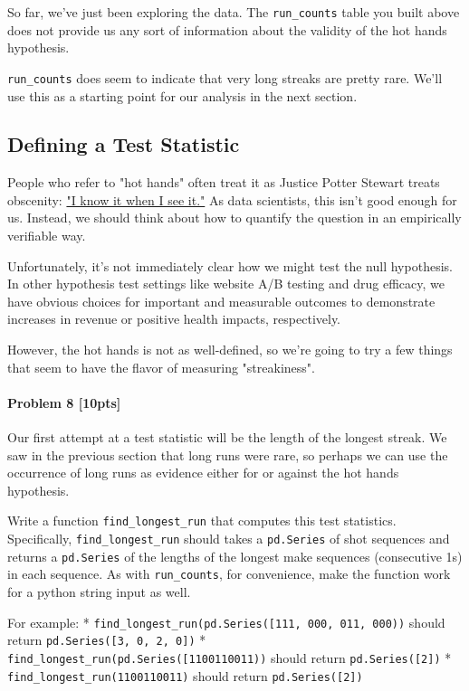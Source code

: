 \documentclass[11pt]{article}
\begin{document}
    So far, we've just been exploring the data. The \texttt{run\_counts}
table you built above does not provide us any sort of information about
the validity of the hot hands hypothesis.

\texttt{run\_counts} does seem to indicate that very long streaks are
pretty rare. We'll use this as a starting point for our analysis in the
next section.

    \subsection{Defining a Test Statistic}\label{defining-a-test-statistic}

People who refer to "hot hands" often treat it as Justice Potter Stewart
treats obscenity:
\href{https://en.wikipedia.org/wiki/I_know_it_when_I_see_it}{"I know it
when I see it."} As data scientists, this isn't good enough for us.
Instead, we should think about how to quantify the question in an
empirically verifiable way.

Unfortunately, it's not immediately clear how we might test the null
hypothesis. In other hypothesis test settings like website A/B testing
and drug efficacy, we have obvious choices for important and measurable
outcomes to demonstrate increases in revenue or positive health impacts,
respectively.

However, the hot hands is not as well-defined, so we're going to try a
few things that seem to have the flavor of measuring "streakiness".

\paragraph{Problem 8 {[}10pts{]}}\label{problem-8-10pts}

Our first attempt at a test statistic will be the length of the longest
streak. We saw in the previous section that long runs were rare, so
perhaps we can use the occurrence of long runs as evidence either for or
against the hot hands hypothesis.

Write a function \texttt{find\_longest\_run} that computes this test
statistics. Specifically, \texttt{find\_longest\_run} should takes a
\texttt{pd.Series} of shot sequences and returns a \texttt{pd.Series} of
the lengths of the longest make sequences (consecutive 1s) in each
sequence. As with \texttt{run\_counts}, for convenience, make the
function work for a python string input as well.

For example: *
\texttt{find\_longest\_run(pd.Series({[}\textquotesingle{}111\textquotesingle{},\ \textquotesingle{}000\textquotesingle{},\ \textquotesingle{}011\textquotesingle{},\ \textquotesingle{}000\textquotesingle{}{]}))}
should return \texttt{pd.Series({[}3,\ 0,\ 2,\ 0{]})} *
\texttt{find\_longest\_run(pd.Series({[}\textquotesingle{}1100110011\textquotesingle{}{]}))}
should return \texttt{pd.Series({[}2{]})} *
\texttt{find\_longest\_run(\textquotesingle{}1100110011\textquotesingle{})}
should return \texttt{pd.Series({[}2{]})}
\end{document}
